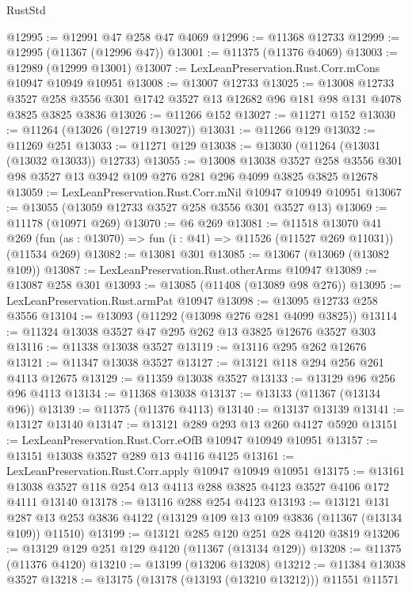 \begin{lexlean}{RustStd}
\begin{coremodule}
@12995 := @12991 @47 @258 @47 @4069
@12996 := @11368 @12733
@12999 := @12995 (@11367 (@12996 @47))
@13001 := @11375 (@11376 @4069)
@13003 := @12989 (@12999 @13001)
@13007 := LexLeanPreservation.Rust.Corr.mCons @10947 @10949 @10951
@13008 := @13007 @12733
@13025 := @13008
    @12733
    @3527
    @258
    @3556
    @301
    @1742
    @3527
    @13
    @12682
    @96
    @181
    @98
    @131
    @4078
    @3825
    @3825
    @3836
@13026 := @11266 @152
@13027 := @11271 @152
@13030 := @11264 (@13026 (@12719 @13027))
@13031 := @11266 @129
@13032 := @11269 @251
@13033 := @11271 @129
@13038 := @13030 (@11264 (@13031 (@13032 @13033)) @12733)
@13055 := @13008
    @13038
    @3527
    @258
    @3556
    @301
    @98
    @3527
    @13
    @3942
    @109
    @276
    @281
    @296
    @4099
    @3825
    @3825
    @12678
@13059 := LexLeanPreservation.Rust.Corr.mNil @10947 @10949 @10951
@13067 := @13055 (@13059 @12733 @3527 @258 @3556 @301 @3527 @13)
@13069 := @11178 (@10971 @269)
@13070 := @6 @269
@13081 := @11518
    @13070
    @41
    @269
    (fun (as : @13070) => fun (i : @41) => @11526 (@11527 @269 @11031))
    (@11534 @269)
@13082 := @13081 @301
@13085 := @13067 (@13069 (@13082 @109))
@13087 := LexLeanPreservation.Rust.otherArms @10947
@13089 := @13087 @258 @301
@13093 := @13085 (@11408 (@13089 @98 @276))
@13095 := LexLeanPreservation.Rust.armPat @10947
@13098 := @13095 @12733 @258 @3556
@13104 := @13093 (@11292 (@13098 @276 @281 @4099 @3825))
@13114 := @11324 @13038 @3527 @47 @295 @262 @13 @3825 @12676 @3527 @303
@13116 := @11338 @13038 @3527
@13119 := @13116 @295 @262 @12676
@13121 := @11347 @13038 @3527
@13127 := @13121 @118 @294 @256 @261 @4113 @12675
@13129 := @11359 @13038 @3527
@13133 := @13129 @96 @256 @96 @4113
@13134 := @11368 @13038
@13137 := @13133 (@11367 (@13134 @96))
@13139 := @11375 (@11376 @4113)
@13140 := @13137 @13139
@13141 := @13127 @13140
@13147 := @13121 @289 @293 @13 @260 @4127 @5920
@13151 := LexLeanPreservation.Rust.Corr.eOfB @10947 @10949 @10951
@13157 := @13151 @13038 @3527 @289 @13 @4116 @4125
@13161 := LexLeanPreservation.Rust.Corr.apply @10947 @10949 @10951
@13175 := @13161 @13038 @3527 @118 @254 @13 @4113 @288 @3825 @4123 @3527 @4106 @172 @4111 @13140
@13178 := @13116 @288 @254 @4123
@13193 := @13121
    @131
    @287
    @13
    @253
    @3836
    @4122
    (@13129 @109 @13 @109 @3836 (@11367 (@13134 @109)) @11510)
@13199 := @13121 @285 @120 @251 @28 @4120 @3819
@13206 := @13129 @129 @251 @129 @4120 (@11367 (@13134 @129))
@13208 := @11375 (@11376 @4120)
@13210 := @13199 (@13206 @13208)
@13212 := @11384 @13038 @3527
@13218 := @13175 (@13178 (@13193 (@13210 @13212))) @11551 @11571

\end{coremodule}
\end{lexlean}
